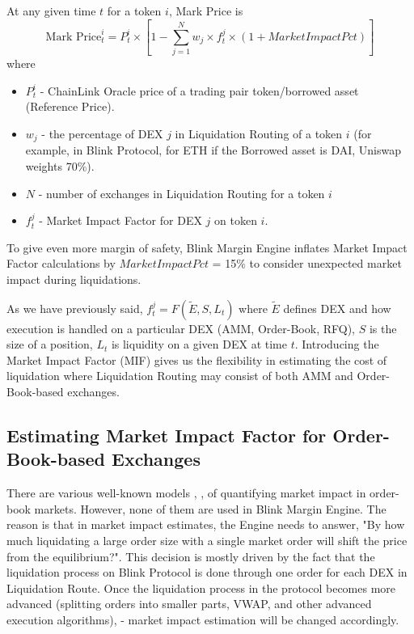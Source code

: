 \documentclass[conference]{IEEEtran}
\begin{document}
At any given time $t$ for a token $i$, Mark Price is \small $$\text{Mark Price}^{i}_{t}=P^{i}_{t}\times[1-\sum_{j=1}^{N}  w_{j}\times f_{t}^{j}\times(1+MarketImpactPct)]$$
where

\begin{itemize}
\item $P^{i}_{t}$ - ChainLink Oracle price of a trading pair token/borrowed asset (Reference Price).
\item $w_{j}$ - the percentage of DEX $j$ in Liquidation Routing of a token $i$ (for example, in Blink Protocol, for ETH if the Borrowed asset is DAI,  Uniswap weights 70\%).
\item $N$ - number of exchanges in Liquidation Routing for a token $i$ 
\item $f_{t}^{j}$ - Market Impact Factor for DEX $j$ on token $i$.
	
\end{itemize}


To give even more margin of safety, Blink Margin Engine inflates Market Impact Factor calculations by $MarketImpactPct$ = 15\% to consider unexpected market impact during liquidations. 

As we have previously said, $f_{t}^{j} = F(\widetilde{E}, S, L_{t})$ where $\widetilde{E}$ defines DEX and how execution is handled on a particular DEX (AMM, Order-Book, RFQ), $S$ is the size of a position, $L_{t}$ is liquidity on a given DEX at time $t$. Introducing the Market Impact Factor (MIF) gives us the flexibility in estimating the cost of liquidation where Liquidation Routing may consist of both AMM and Order-Book-based exchanges.


\subsection{Estimating Market Impact Factor for Order-Book-based Exchanges}

There are various well-known models \cite{almgren2005}, \cite{kissel2004}, \cite{kyle1985} of quantifying market impact in order-book markets. However, none of them are used in Blink Margin Engine. The reason is that in market impact estimates, the Engine needs to answer, "By how much liquidating a large order size with a single market order will shift the price from the equilibrium?". This decision is mostly driven by the fact that the liquidation process on Blink Protocol is done through one order for each DEX in Liquidation Route. Once the liquidation process in the protocol becomes more advanced (splitting orders into smaller parts, VWAP, and other advanced execution algorithms), - market impact estimation will be changed accordingly.  
\end{document}
